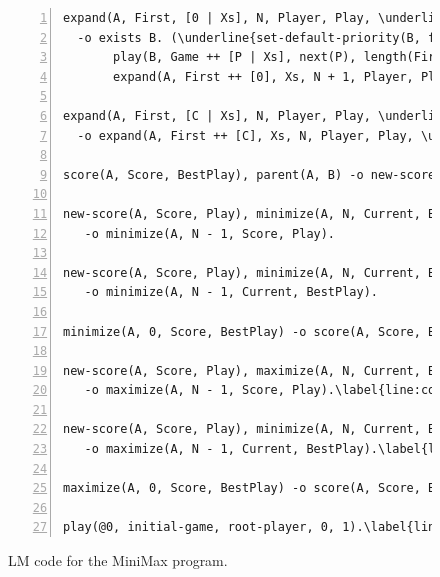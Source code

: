 \begin{figure}[ht]
\begin{Verbatim}[numbers=left,commandchars=\\\{\},fontsize=\scriptsize]
expand(A, First, [0 | Xs], N, Player, Play, \underline{Depth}), Depth < 5\label{line:coord:minimax_rule41}\hfill// Rule 6: create child node
  -o exists B. (\underline{set-default-priority(B, float(Depth + 1))},\label{line:coord:minimax_coord3}
       play(B, Game ++ [P | Xs], next(P), length(First), \underline{Depth + 1}), parent(B, A),
       expand(A, First ++ [0], Xs, N + 1, Player, Play, \underline{Depth})).\label{line:coord:minimax_rule42}

expand(A, First, [C | Xs], N, Player, Play, \underline{Depth}) C <> 0\label{line:coord:minimax_expand11}\label{line:coord:minimax_rule51}\hfill// Rule 7: next game play
  -o expand(A, First ++ [C], Xs, N, Player, Play, \underline{Depth}).\label{line:coord:minimax_expand2}\label{line:coord:minimax_rule52}

score(A, Score, BestPlay), parent(A, B) -o new-score(B, Score, BestPlay).\label{line:coord:minimax_new}\hfill// Rule 8: sending score to parent node

new-score(A, Score, Play), minimize(A, N, Current, BestPlay), Current > Score\label{line:coord:minimax_minimize1}\hfill// Rule 9: keep current score
   -o minimize(A, N - 1, Score, Play).

new-score(A, Score, Play), minimize(A, N, Current, BestPlay), Current <= Score\hfill// Rule 10: select new best
   -o minimize(A, N - 1, Current, BestPlay).

minimize(A, 0, Score, BestPlay) -o score(A, Score, BestPlay).\label{line:coord:minimax_minimize2}// Rule 11: score minimized

new-score(A, Score, Play), maximize(A, N, Current, BestPlay), Current < Score\label{line:coord:minimax_maximize1}\label{line:coord:minimax_maximize_rule11}\hfill// Rule 12: keep current score
   -o maximize(A, N - 1, Score, Play).\label{line:coord:minimax_maximize_rule12}

new-score(A, Score, Play), minimize(A, N, Current, BestPlay), Current >= Score\label{line:coord:minimax_maximize_rule21}\hfill// Rule 13: select new best
   -o maximize(A, N - 1, Current, BestPlay).\label{line:coord:minimax_maximize_rule22}

maximize(A, 0, Score, BestPlay) -o score(A, Score, BestPlay).\label{line:coord:minimax_maximize2}\hfill// Rule 14: score maximized

play(@0, initial-game, root-player, 0, 1).\label{line:coord:minimax_axiom}\hfill// Initial fact
\end{Verbatim}
\caption{LM code for the MiniMax program.}
\label{code:coord:minimax}
\end{figure}

